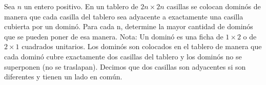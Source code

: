 Sea $n$ un entero positivo. En un tablero de $2n \times 2n$ casillas se colocan dominós de
manera que cada casilla del tablero sea adyacente a exactamente una casilla cubierta por un dominó.
Para cada n, determine la mayor cantidad de dominós que se pueden poner de esa manera.
Nota: Un dominó es una ficha de $1 \times 2$ o de $2 \times 1$ cuadrados unitarios. Los dominós son colocados
en el tablero de manera que cada dominó cubre exactamente dos casillas del tablero y los dominós no
se superponen (no se traslapan). Decimos que dos casillas son adyacentes si son diferentes y tienen
un lado en común.